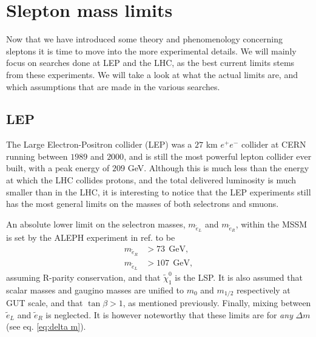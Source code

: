 \documentclass[twocolumn,a4paper,10pt]{article}
\begin{document}
\section{Slepton mass limits}

Now that we have introduced some theory and phenomenology concerning sleptons it is time to move into 
the more experimental details. We will mainly focus on searches done at LEP and the LHC, as the best 
current limits stems from these experiments. We will take a look at what the actual limits are, and 
which assumptions that are made in the various searches.    

\subsection{LEP}

The Large Electron-Positron collider (LEP) was a $27$ km $e^+e^-$ collider at CERN running between 
$1989$ and $2000$, and is still the most powerful lepton collider ever built, with a peak energy of 
$209$ GeV. Although this is much less than the energy at which the LHC collides protons, and the 
total delivered luminosity is much smaller than in the LHC, it is interesting to notice that the 
LEP experiments still has the most general limits on the masses of both selectrons and smuons.  

An absolute lower limit on the selectron masses, $m_{\tilde{e}_L}$ and $m_{\tilde{e}_R}$,  within the 
MSSM is set by the ALEPH experiment in ref. \cite{ALEPH:2002} to be  
\begin{align*}
m_{\tilde{e}_R} & > 73 \:\: \text{GeV}, \\
m_{\tilde{e}_L} & > 107 \:\: \text{GeV},   
\end{align*}       
assuming R-parity conservation, and that $\tilde{\chi}_1^0$ is the LSP. It is also assumed that 
scalar masses and gaugino masses are unified to $m_0$ and $m_{1/2}$ respectively at GUT scale, and 
that $\tan\beta > 1$, as mentioned previously. Finally, mixing between $\tilde{e}_L$ and $\tilde{e}_R$ 
is neglected. It is however noteworthy that these limits are for \textit{any} $\Delta m$ (see eq. 
\ref{eq:delta m}). 
\end{document}
